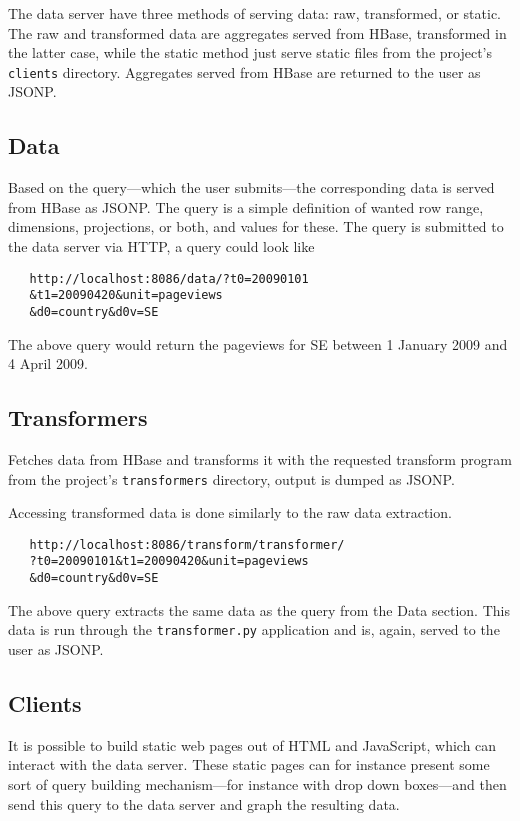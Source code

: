 \documentclass[a4paper,10pt]{book}
\begin{document}
The data server have three methods of serving data: raw, transformed, or
static. The raw and transformed data are aggregates served from HBase,
transformed in the latter case, while the static method just serve static
files from the project's \texttt{clients} directory. Aggregates served from
HBase are returned to the user as JSONP.


\subsection*{Data}

Based on the query---which the user submits---the corresponding data is
served from HBase as JSONP. The query is a simple definition of wanted row
range, dimensions, projections, or both, and values for these. The query is
submitted to the data server via HTTP, a query could look like

\begin{verbatim}
   http://localhost:8086/data/?t0=20090101
   &t1=20090420&unit=pageviews
   &d0=country&d0v=SE
\end{verbatim}

\noindent The above query would return the pageviews for SE between 1 January
2009 and 4 April 2009.


\subsection*{Transformers}

Fetches data from HBase and transforms it with the requested transform
program from the project's \texttt{transformers} directory, output is
dumped as JSONP.

Accessing transformed data is done similarly to the raw data extraction.

\begin{verbatim}
   http://localhost:8086/transform/transformer/
   ?t0=20090101&t1=20090420&unit=pageviews
   &d0=country&d0v=SE
\end{verbatim}

\noindent The above query extracts the same data as the query from the Data
section. This data is run through the \texttt{transformer.py} application and
is, again, served to the user as JSONP.


\subsection*{Clients}

It is possible to build static web pages out of HTML and JavaScript, which
can interact with the data server. These static pages can for instance
present some sort of query building mechanism---for instance with drop down
boxes---and then send this query to the data server and graph the resulting
data.
\end{document}
